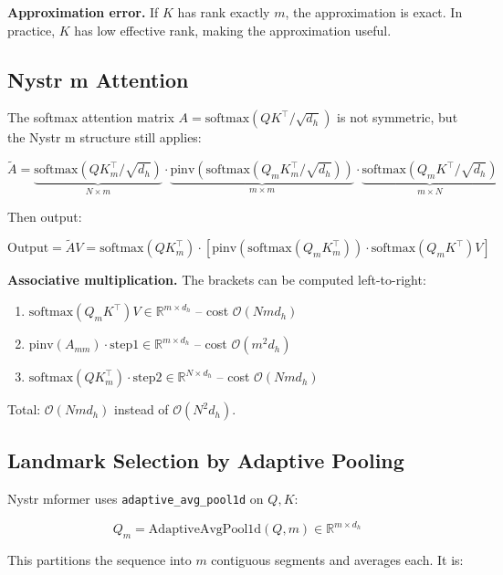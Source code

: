 \textbf{Approximation error.} If $K$ has rank exactly $m$, the approximation is 
exact. In practice, $K$ has low effective rank, making the approximation 
useful.

\subsection{Nystr m Attention}

The softmax attention matrix $A = \mathrm{softmax}(Q K^\top / \sqrt{d_h})$ 
is not symmetric, but the Nystr m structure still applies:

\[
\tilde{A} = \underbrace{\mathrm{softmax}(Q K_m^\top / \sqrt{d_h})}_{N \times m} \cdot \underbrace{\mathrm{pinv}(\mathrm{softmax}(Q_m K_m^\top / \sqrt{d_h}))}_{m \times m} \cdot \underbrace{\mathrm{softmax}(Q_m K^\top / \sqrt{d_h})}_{m \times N}
\tag{3.3}
\]

Then output:

\[
\text{Output} = \tilde{A} V = \mathrm{softmax}(Q K_m^\top) \cdot \left[ \mathrm{pinv}(\mathrm{softmax}(Q_m K_m^\top)) \cdot \mathrm{softmax}(Q_m K^\top) V \right]
\tag{3.4}
\]

\textbf{Associative multiplication.} The brackets can be computed left-to-right:

\begin{enumerate}
\item $\mathrm{softmax}(Q_m K^\top) V \in \mathbb{R}^{m \times d_h}$ -- cost $\mathcal{O}(N m d_h)$
\item $\mathrm{pinv}(A_{mm}) \cdot \text{step1} \in \mathbb{R}^{m \times d_h}$ -- cost $\mathcal{O}(m^2 d_h)$
\item $\mathrm{softmax}(Q K_m^\top) \cdot \text{step2} \in \mathbb{R}^{N \times d_h}$ -- cost $\mathcal{O}(N m d_h)$

\end{enumerate}
Total: $\mathcal{O}(N m d_h)$ instead of $\mathcal{O}(N^2 d_h)$.

\subsection{Landmark Selection by Adaptive Pooling}

Nystr mformer uses \texttt{adaptive\_avg\_pool1d} on $Q, K$:

\[
Q_m = \mathrm{AdaptiveAvgPool1d}(Q, m) \in \mathbb{R}^{m \times d_h}
\tag{3.5}
\]

This partitions the sequence into $m$ contiguous segments and averages 
each. It is:

